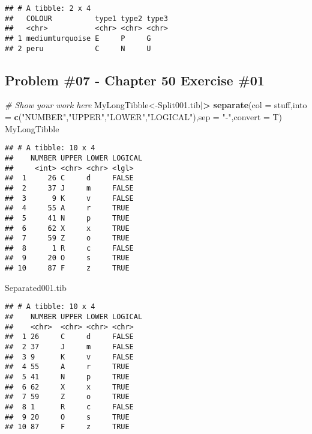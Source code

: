 \documentclass[
]{article}
\newenvironment{Shaded}{\begin{snugshade}}{\end{snugshade}}
\newcommand{\AttributeTok}[1]{\textcolor[rgb]{0.13,0.29,0.53}{#1}}
\newcommand{\CommentTok}[1]{\textcolor[rgb]{0.56,0.35,0.01}{\textit{#1}}}
\newcommand{\FunctionTok}[1]{\textcolor[rgb]{0.13,0.29,0.53}{\textbf{#1}}}
\newcommand{\NormalTok}[1]{#1}
\newcommand{\OtherTok}[1]{\textcolor[rgb]{0.56,0.35,0.01}{#1}}
\newcommand{\SpecialCharTok}[1]{\textcolor[rgb]{0.81,0.36,0.00}{\textbf{#1}}}
\newcommand{\StringTok}[1]{\textcolor[rgb]{0.31,0.60,0.02}{#1}}
\begin{document}
\begin{verbatim}
## # A tibble: 2 x 4
##   COLOUR          type1 type2 type3
##   <chr>           <chr> <chr> <chr>
## 1 mediumturquoise E     P     G    
## 2 peru            C     N     U
\end{verbatim}

\newpage

\hypertarget{problem-07---chapter-50-exercise-01}{%
\subsection{Problem \#07 - Chapter 50 Exercise
\#01}\label{problem-07---chapter-50-exercise-01}}

\begin{Shaded}
\begin{Highlighting}[]
\CommentTok{\# Show your work here}
\NormalTok{MyLongTibble}\OtherTok{\textless{}{-}}\NormalTok{Split001.tib}\SpecialCharTok{|\textgreater{}}
  \FunctionTok{separate}\NormalTok{(}\AttributeTok{col =}\NormalTok{ stuff,}\AttributeTok{into =} \FunctionTok{c}\NormalTok{(}\StringTok{"NUMBER"}\NormalTok{,}\StringTok{"UPPER"}\NormalTok{,}\StringTok{"LOWER"}\NormalTok{,}\StringTok{"LOGICAL"}\NormalTok{),}\AttributeTok{sep =} \StringTok{"{-}"}\NormalTok{,}\AttributeTok{convert =}\NormalTok{ T)}
\NormalTok{MyLongTibble}
\end{Highlighting}
\end{Shaded}

\begin{verbatim}
## # A tibble: 10 x 4
##    NUMBER UPPER LOWER LOGICAL
##     <int> <chr> <chr> <lgl>  
##  1     26 C     d     FALSE  
##  2     37 J     m     FALSE  
##  3      9 K     v     FALSE  
##  4     55 A     r     TRUE   
##  5     41 N     p     TRUE   
##  6     62 X     x     TRUE   
##  7     59 Z     o     TRUE   
##  8      1 R     c     FALSE  
##  9     20 O     s     TRUE   
## 10     87 F     z     TRUE
\end{verbatim}

\begin{Shaded}
\begin{Highlighting}[]
\NormalTok{Separated001.tib}
\end{Highlighting}
\end{Shaded}

\begin{verbatim}
## # A tibble: 10 x 4
##    NUMBER UPPER LOWER LOGICAL
##    <chr>  <chr> <chr> <chr>  
##  1 26     C     d     FALSE  
##  2 37     J     m     FALSE  
##  3 9      K     v     FALSE  
##  4 55     A     r     TRUE   
##  5 41     N     p     TRUE   
##  6 62     X     x     TRUE   
##  7 59     Z     o     TRUE   
##  8 1      R     c     FALSE  
##  9 20     O     s     TRUE   
## 10 87     F     z     TRUE
\end{verbatim}
\end{document}
